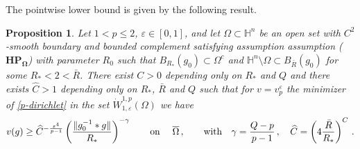 \documentclass[10pt]{amsart}
\numberwithin{equation}{section}
\newtheorem{proposition}[theorem]{Proposition}
\theoremstyle{definition}
\newcommand{\He}{\mathbb{H}}
\begin{document}
 
The pointwise lower bound is given by the following result.
\begin{proposition}
\label{univ-pt-lbound-infinity}
 Let  $1<p\leq 2$, $\varepsilon \in [0,1]$, and let $\Omega \subset \He^n$ be an open set with $C^2$-smooth boundary and bounded complement satisfying assumption assumption ($\mathbf{HP_\Omega}$) with parameter $R_0$ such that $B_{R_\ast}(g_0) \subset \Omega^c$  and $\He^n \setminus \Omega \subset B_{\bar{R}}(g_0)$ for some $R_\ast<2 <\bar{R}$.  There exist  $C>0$ depending only on $R_\ast$ and $Q$ and there exists $\widehat{C}>1$ depending only on $R_\ast$, $\bar{R}$ and $Q$ such that  for $v=v^\varepsilon_p$ the minimizer of \eqref{p-dirichlet} in the set $\dot{W}^{1,p}_{1, \varepsilon} (\Omega)$ we have 
 \begin{equation}
 \label{pt-lbound-infinity}
 v(g) \geq \widehat{C}^{- \frac{\varepsilon^4}{p-1}}     \left( \frac{\| g_0^{-1}*g\|}{R_\ast} \right)^{-\gamma} \qquad \hbox{on } \quad \overline{\Omega} \, , \qquad \hbox{with} \quad \gamma=\frac{Q-p}{p-1} \, , \quad\widehat{C}= \left( 4\frac{\bar{R}}{R_\ast}\right)^C \, .
 \end{equation}
\end{proposition}
\end{document}

